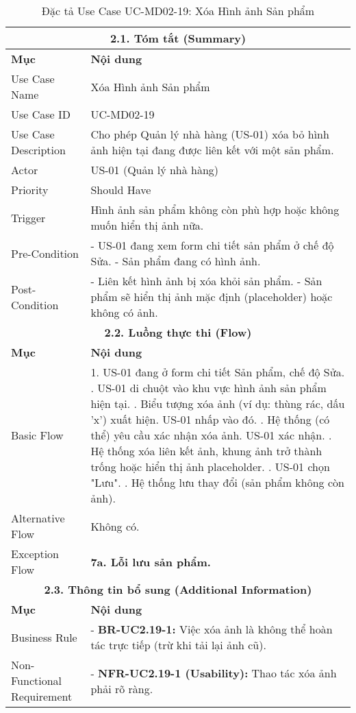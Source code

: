 \begin{longtable}{|m{4cm}|p{11cm}|}
\caption{Đặc tả Use Case UC-MD02-19: Xóa Hình ảnh Sản phẩm} \label{tab:uc_md02_19_revised} \\
\hline
\multicolumn{2}{|c|}{\textbf{2.1. Tóm tắt (Summary)}} \\
\hline
\textbf{Mục} & \textbf{Nội dung} \\
\hline
\endhead %
\hline
\endfoot %
\hline
\endlastfoot %
Use Case Name & Xóa Hình ảnh Sản phẩm \\
\hline
Use Case ID & UC-MD02-19 \\
\hline
Use Case Description & Cho phép Quản lý nhà hàng (US-01) xóa bỏ hình ảnh hiện tại đang được liên kết với một sản phẩm. \\
\hline
Actor & US-01 (Quản lý nhà hàng) \\
\hline
Priority & Should Have \\
\hline
Trigger & Hình ảnh sản phẩm không còn phù hợp hoặc không muốn hiển thị ảnh nữa. \\
\hline
Pre-Condition & - US-01 đang xem form chi tiết sản phẩm ở chế độ Sửa. \newline - Sản phẩm đang có hình ảnh. \\
\hline
Post-Condition & - Liên kết hình ảnh bị xóa khỏi sản phẩm. \newline - Sản phẩm sẽ hiển thị ảnh mặc định (placeholder) hoặc không có ảnh. \\
\hline
\multicolumn{2}{|c|}{\textbf{2.2. Luồng thực thi (Flow)}} \\
\hline
\textbf{Mục} & \textbf{Nội dung} \\
\hline
Basic Flow & 1. US-01 đang ở form chi tiết Sản phẩm, chế độ Sửa. \newline 2. US-01 di chuột vào khu vực hình ảnh sản phẩm hiện tại. \newline 3. Biểu tượng xóa ảnh (ví dụ: thùng rác, dấu 'x') xuất hiện. US-01 nhấp vào đó. \newline 4. Hệ thống (có thể) yêu cầu xác nhận xóa ảnh. US-01 xác nhận. \newline 5. Hệ thống xóa liên kết ảnh, khung ảnh trở thành trống hoặc hiển thị ảnh placeholder. \newline 6. US-01 chọn "Lưu". \newline 7. Hệ thống lưu thay đổi (sản phẩm không còn ảnh). \\
\hline
Alternative Flow & Không có. \\
\hline
Exception Flow & \textbf{7a. Lỗi lưu sản phẩm.} \\
\hline
\multicolumn{2}{|c|}{\textbf{2.3. Thông tin bổ sung (Additional Information)}} \\
\hline
\textbf{Mục} & \textbf{Nội dung} \\
\hline
Business Rule & - \textbf{BR-UC2.19-1:} Việc xóa ảnh là không thể hoàn tác trực tiếp (trừ khi tải lại ảnh cũ). \\
\hline
Non-Functional Requirement & - \textbf{NFR-UC2.19-1 (Usability):} Thao tác xóa ảnh phải rõ ràng. \\
\hline
\end{longtable}

